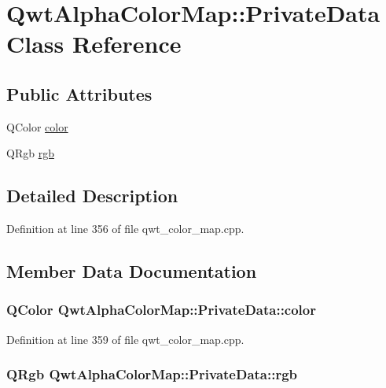\hypertarget{class_qwt_alpha_color_map_1_1_private_data}{\section{Qwt\-Alpha\-Color\-Map\-:\-:Private\-Data Class Reference}
\label{class_qwt_alpha_color_map_1_1_private_data}
}
\subsection*{Public Attributes}
\begin{DoxyCompactItemize}
\item 
Q\-Color \hyperlink{class_qwt_alpha_color_map_1_1_private_data_abac3c6764c611bd20dd0c74b7f463f1b}{color}
\item 
Q\-Rgb \hyperlink{class_qwt_alpha_color_map_1_1_private_data_a5c733af5ebd608f5a649434785b979ba}{rgb}
\end{DoxyCompactItemize}


\subsection{Detailed Description}


Definition at line 356 of file qwt\-\_\-color\-\_\-map.\-cpp.



\subsection{Member Data Documentation}
\hypertarget{class_qwt_alpha_color_map_1_1_private_data_abac3c6764c611bd20dd0c74b7f463f1b}{
\subsubsection[{color}]{\setlength{\rightskip}{0pt plus 5cm}Q\-Color Qwt\-Alpha\-Color\-Map\-::\-Private\-Data\-::color}}\label{class_qwt_alpha_color_map_1_1_private_data_abac3c6764c611bd20dd0c74b7f463f1b}


Definition at line 359 of file qwt\-\_\-color\-\_\-map.\-cpp.

\hypertarget{class_qwt_alpha_color_map_1_1_private_data_a5c733af5ebd608f5a649434785b979ba}{
\subsubsection[{rgb}]{\setlength{\rightskip}{0pt plus 5cm}Q\-Rgb Qwt\-Alpha\-Color\-Map\-::\-Private\-Data\-::rgb}}\label{class_qwt_alpha_color_map_1_1_private_data_a5c733af5ebd608f5a649434785b979ba}


